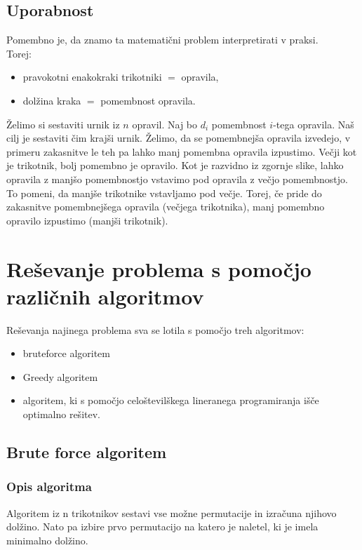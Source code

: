 \documentclass[a4paper,12pt]{article}
\theoremstyle{definition}
\theoremstyle{plain}
\begin{document}
\subsection{Uporabnost}
Pomembno je, da znamo ta matematični problem interpretirati v praksi. \\
Torej:
\begin{itemize}
    \item pravokotni enakokraki trikotniki $=$ opravila,
    \item dolžina kraka $=$ pomembnost opravila.
\end{itemize}

Želimo si sestaviti urnik iz $n$ opravil. Naj bo $d_i$ pomembnost $i$-tega opravila. Naš cilj je sestaviti čim krajši urnik. Želimo, da se pomembnejša opravila izvedejo, v primeru zakasnitve le teh pa lahko manj pomembna opravila izpustimo.
Večji kot je trikotnik, bolj pomembno je opravilo. Kot je razvidno iz zgornje slike, lahko opravila z manjšo pomembnostjo vstavimo pod opravila z večjo pomembnostjo. To pomeni, da manjše trikotnike vstavljamo pod večje. Torej, če pride do zakasnitve
pomembnejšega opravila (večjega trikotnika), manj pomembno opravilo  izpustimo (manjši trikotnik).


\section{Reševanje problema s pomočjo različnih algoritmov}
Reševanja najinega problema sva se lotila s pomočjo treh algoritmov:
\begin{itemize}
    \item bruteforce algoritem
    \item Greedy algoritem
    \item algoritem, ki s pomočjo celoštevilškega lineranega programiranja išče optimalno rešitev.
\end{itemize}

\subsection{Brute force algoritem}
\subsubsection{Opis algoritma}
Algoritem iz n trikotnikov sestavi vse možne permutacije in izračuna njihovo dolžino. Nato 
pa izbire prvo permutacijo na katero je naletel, ki je imela minimalno dolžino.
\end{document}

